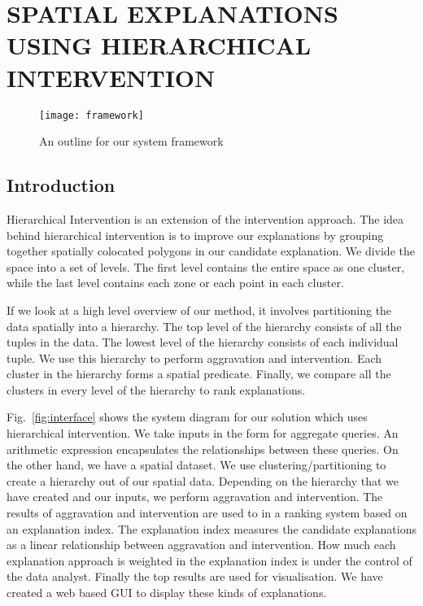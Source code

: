 \chapter{SPATIAL EXPLANATIONS USING HIERARCHICAL INTERVENTION}
\label{chp:proposed}
\label{sec:hei_intervention}

\begin{figure}[h]
\texttt{[image: framework]}
\caption{An outline for our system framework}
\label{fig:framework}
\end{figure}

\section{Introduction}
Hierarchical Intervention is an extension of the intervention approach. The idea behind hierarchical intervention is to improve our explanations by grouping together spatially colocated polygons in our candidate explanation. We divide the space into a set of levels. The first level contains the entire space as one cluster, while the last level contains each zone or each point in each cluster.

If we look at a high level overview of our method, it involves partitioning the data spatially into a hierarchy. The top level of the hierarchy consists of all the tuples in the data. The lowest level of the hierarchy consists of each individual tuple. We use this hierarchy to perform aggravation and intervention. Each cluster in the hierarchy forms a spatial predicate. Finally, we compare all the clusters in every level of the hierarchy to rank explanations.

Fig.~\ref{fig:interface} shows the system diagram for our solution which uses hierarchical intervention. We take inputs in the form for aggregate queries. An arithmetic expression encapsulates the relationships between these queries. On the other hand, we have a spatial dataset. We use clustering/partitioning to create a hierarchy out of our spatial data. Depending on the hierarchy that we have created and our inputs, we perform aggravation and intervention. The results of aggravation and intervention are used to in a ranking system based on an explanation index. The explanation index measures the candidate explanations as a linear relationship between aggravation and intervention. How much each explanation approach is weighted in the explanation index is under the control of the data analyst. Finally the top results are used for visualisation. We have created a web based GUI to display these kinds of explanations.

